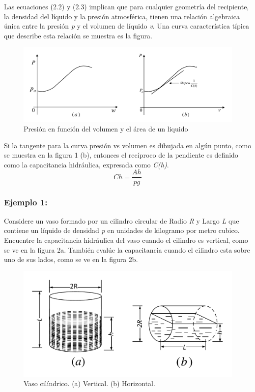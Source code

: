 \documentclass[a4paper,12pt,twoside]{proyectotanquesecci}
\begin{document}
Las ecuaciones (2.2) y (2.3) implican que para cualquier geometría del recipiente, la densidad del líquido y la presión atmosférica, tienen una relación algebraica única entre la presión \textit{p} y el volumen de líquido \textit{v}. Una curva característica típica que describe esta relación se muestra es la figura.


\begin{figure}[h]
\centering
\includegraphics[scale=0.4]{Figura1}
\renewcommand{\figurename}{Fig.}
\caption{Presión en función del volumen y el área de un liquido}
\label{Presión en función del volumen y el área de un liquido}
\end{figure}

Si la tangente para la curva  presión vs volumen es dibujada en algún punto, como se muestra en la figura 1 (b), entonces el recíproco de la pendiente es definido como la capacitancia hidráulica, expresada como \textit{C(h)}.\\

\begin{equation}
C{h}=\frac{A{h}}{pg}
\label{Ecu 5}
\end{equation}

\subsubsection{Ejemplo 1:}

Considere un vaso formado por un cilindro circular de Radio \textit{R} y Largo \textit{L} que contiene un líquido de densidad \textit{p} en unidades de kilogramo por metro cubico. Encuentre la capacitancia hidráulica del vaso cuando el cilindro es vertical, como se ve en la figura 2a. También evalúe la capacitancia cuando el cilindro esta sobre uno de sus lados, como se ve en la figura 2b.

\begin{figure}[h]
\centering
\includegraphics[scale=0.4]{Figura2}
\renewcommand{\figurename}{Fig.}
\caption{Vaso cilíndrico. (a) Vertical. (b) Horizontal.}
\label{Vaso cilíndrico. (a) Cilindro vertical. (b) Cilindro horizontal.}
\end{figure}
\end{document}
